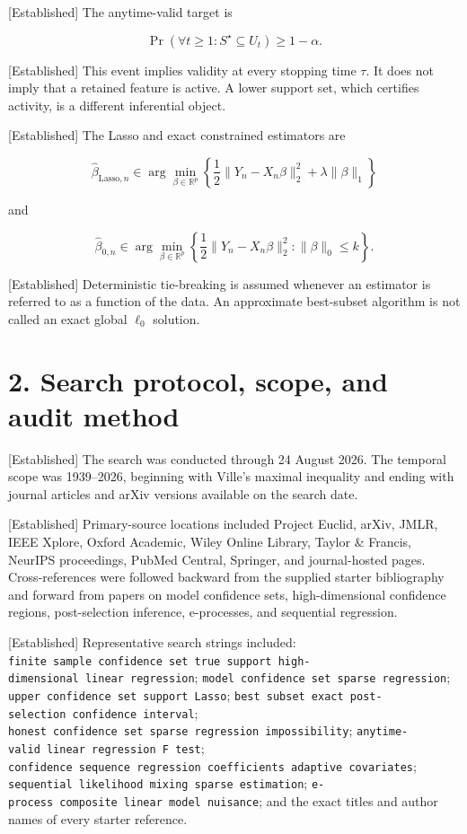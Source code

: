 \documentclass[
  english,
  11pt,
  a4paper,
]{article}
\begin{document}
{[}Established{]} The anytime-valid target is

$$
\Pr\left(\forall t\ge1:S^\star\subseteq U_t\right)\ge1-\alpha.
$$

{[}Established{]} This event implies validity at every stopping time
$\tau$. It does not imply that a retained feature is active. A lower
support set, which certifies activity, is a different inferential
object.

{[}Established{]} The Lasso and exact constrained estimators are

$$
\widehat\beta_{\mathrm{Lasso},n}
\in\arg\min_{\beta\in\mathbb R^p}
\left\{\frac12\lVert Y_n-X_n\beta\rVert_2^2+\lambda\lVert\beta\rVert_1\right\}
$$

and

$$
\widehat\beta_{0,n}
\in\arg\min_{\beta\in\mathbb R^p}
\left\{\frac12\lVert Y_n-X_n\beta\rVert_2^2:
\lVert\beta\rVert_0\le k\right\}.
$$

{[}Established{]} Deterministic tie-breaking is assumed whenever an
estimator is referred to as a function of the data. An approximate
best-subset algorithm is not called an exact global $\ell_0$ solution.

\section{2. Search protocol, scope, and audit
method}\label{search-protocol-scope-and-audit-method}

{[}Established{]} The search was conducted through 24 August 2026. The
temporal scope was 1939--2026, beginning with Ville's maximal inequality
and ending with journal articles and arXiv versions available on the
search date.

{[}Established{]} Primary-source locations included Project Euclid,
arXiv, JMLR, IEEE Xplore, Oxford Academic, Wiley Online Library, Taylor
\& Francis, NeurIPS proceedings, PubMed Central, Springer, and
journal-hosted pages. Cross-references were followed backward from the
supplied starter bibliography and forward from papers on model
confidence sets, high-dimensional confidence regions, post-selection
inference, e-processes, and sequential regression.

{[}Established{]} Representative search strings included:
\texttt{finite\ sample\ confidence\ set\ true\ support\ high-dimensional\ linear\ regression};
\texttt{model\ confidence\ set\ sparse\ regression};
\texttt{upper\ confidence\ set\ support\ Lasso};
\texttt{best\ subset\ exact\ post-selection\ confidence\ interval};
\texttt{honest\ confidence\ set\ sparse\ regression\ impossibility};
\texttt{anytime-valid\ linear\ regression\ F\ test};
\texttt{confidence\ sequence\ regression\ coefficients\ adaptive\ covariates};
\texttt{sequential\ likelihood\ mixing\ sparse\ estimation};
\texttt{e-process\ composite\ linear\ model\ nuisance}; and the exact
titles and author names of every starter reference.
\end{document}
